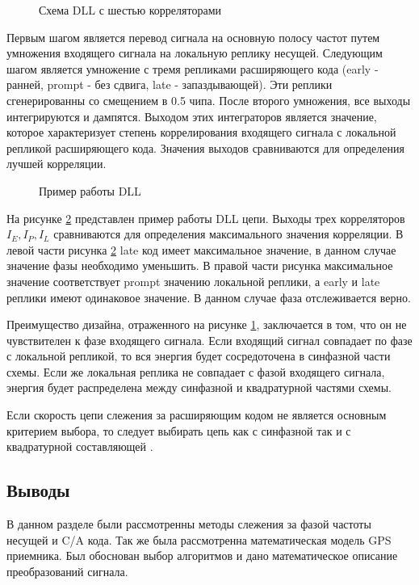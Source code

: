 \begin{figure}[h]
\begin{center}
\end{center}
\caption{Схема DLL с шестью корреляторами}
\label{pic:dll}
\end{figure}

Первым шагом является перевод сигнала на основную полосу частот путем умножения входящего сигнала на локальную реплику
несущей. Следующим шагом является умножение с тремя репликами расширяющего кода (early - ранней, prompt - без сдвига, late - запаздывающей).
Эти реплики сгенерированны со  смещением в 0.5 чипа.
После второго умножения, все выходы интегрируются и дампятся. Выходом этих интеграторов является
значение, которое характеризует степень коррелирования входящего сигнала с локальной репликой расширяющего кода.
Значения выходов сравниваются для определения лучшей корреляции.

\begin{figure}[h]
\begin{center}
\end{center}
\caption{Пример работы DLL}
\label{pic:DLL_cor}
\end{figure}

На рисунке \ref{pic:DLL_cor} представлен пример работы DLL цепи. Выходы трех корреляторов ${I_E, I_P, I_L}$ сравниваются для определения
максимального значения корреляции. В левой части рисунка \ref{pic:DLL_cor} late код имеет максимальное значение, в данном случае значение
фазы необходимо уменьшить. В правой части рисунка максимальное значение соответствует prompt значению локальной реплики, а early и late
реплики имеют одинаковое значение. В данном случае фаза отслеживается верно.

Преимущество дизайна, отраженного на рисунке \ref{pic:dll}, заключается в том, что он не чувствителен к фазе входящего
сигнала. Если входящий сигнал совпадает по фазе с локальной репликой, то вся энергия будет сосредоточена в 
синфазной части схемы. Если же локальная реплика не совпадает с фазой входящего сигнала, энергия будет
распределена между синфазной и квадратурной частями схемы.

Если скорость цепи слежения за расширяющим кодом не является основным критерием выбора, то следует выбирать
цепь как с синфазной так и с квадратурной составляющей \cite{gps}.

\subsection*{Выводы}
В данном разделе были рассмотренны методы слежения за фазой частоты несущей и C/A кода. Так же была рассмотренна математическая модель
GPS приемника. Был обоснован выбор алгоритмов и дано математическое описание преобразований сигнала.

\newpage
